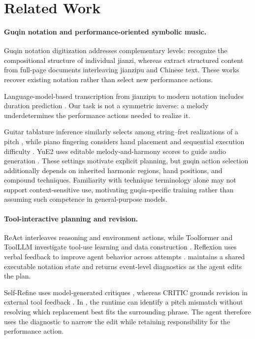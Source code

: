 \section{Related Work}\label{sec:related}

\paragraph{Guqin notation and performance-oriented symbolic music.}
Guqin notation digitization addresses complementary levels: \citet{li2026zeroshotjianzi} recognize the compositional structure of individual jianzi, whereas \citet{li2026jztab} extract structured content from full-page documents interleaving jianzipu and Chinese text. These works recover existing notation rather than select new performance actions.

Language-model-based transcription from jianzipu to modern notation includes duration prediction \cite{shi2024guqintranscription}. Our task is not a symmetric inverse: a melody underdetermines the performance actions needed to realize it.

Guitar tablature inference similarly selects among string--fret realizations of a pitch \cite{edwards2024miditotab}, while piano fingering considers hand placement and sequential execution difficulty \cite{iman2024pianofingering}. YuE2 uses editable melody-and-harmony scores to guide audio generation \cite{yuan2026yue2}. These settings motivate explicit planning, but guqin action selection additionally depends on inherited harmonic regions, hand positions, and compound techniques. Familiarity with technique terminology alone may not support context-sensitive use, motivating guqin-specific training rather than assuming such competence in general-purpose models.

\paragraph{Tool-interactive planning and revision.}
ReAct interleaves reasoning and environment actions, while Toolformer and ToolLLM investigate tool-use learning and data construction \cite{yao2023react,schick2023toolformer,qin2024toolllm}. Reflexion uses verbal feedback to improve agent behavior across attempts \cite{shinn2023reflexion}. \system maintains a shared executable notation state and returns event-level diagnostics as the agent edits the plan.

Self-Refine uses model-generated critiques \cite{madaan2023selfrefine}, whereas CRITIC grounds revision in external tool feedback \cite{gou2024critic}. In \system, the runtime can identify a pitch mismatch without resolving which replacement best fits the surrounding phrase. The agent therefore uses the diagnostic to narrow the edit while retaining responsibility for the performance action.

